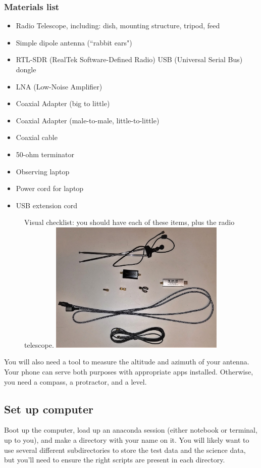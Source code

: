 \documentclass[11pt]{article}
\begin{document}
\clearpage
\subsubsection{Materials list}
\begin{itemize}
    \item Radio Telescope, including: dish, mounting structure, tripod, feed
    \item Simple dipole antenna (``rabbit ears")
    \item RTL-SDR (RealTek Software-Defined Radio) USB (Universal Serial Bus) dongle
    \item LNA (Low-Noise Amplifier)
    \item Coaxial Adapter (big to little)
    \item Coaxial Adapter (male-to-male, little-to-little)
    \item Coaxial cable
    \item 50-ohm terminator
    \item Observing laptop
    \item Power cord for laptop
    \item USB extension cord
\end{itemize}
\begin{figure}[h]
    \centering
    Visual checklist: you should have each of these items, plus the radio telescope.
    \includegraphics[width=0.75\textwidth]{RadioLabPhotos/radiolab_equipment.jpg}
\end{figure}

You will also need a tool to measure the altitude and azimuth of your antenna.
Your phone can serve both purposes with appropriate apps installed.
Otherwise, you need a compass, a protractor, and a level.



\subsection{Set up computer}
\label{sec:computer}
Boot up the computer, load up an anaconda session (either notebook or terminal,
up to you), and make a directory with your name on it.  You will likely want to
use several different subdirectories to store the test data and the science
data, but you'll need to ensure the right scripts are present in each
directory.
\end{document}
